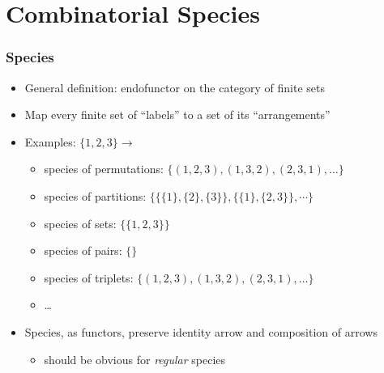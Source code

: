 \section{Combinatorial Species}

\begin{frame}
\frametitle{Species}

\begin{itemize}
\item General definition: endofunctor on the category of finite sets

\item Map every finite set of ``labels'' to a set of its ``arrangements''

\item Examples: $\{1, 2, 3\} \rightarrow$

\begin{itemize}
\item species of permutations:
$\big\{(1,2,3), (1,3,2), (2,3,1), \dots\big\}$
\item species of partitions:
$\Big\{\big\{\{1\},\{2\},\{3\}\big\}, \big\{\{1\}, \{2,3\}\big\}, \cdots \Big\}$
\item species of sets:
$\big\{\{1,2,3\}\big\}$
\item species of pairs:
$\{\}$
\item species of triplets:
$\big\{(1,2,3), (1,3,2), (2,3,1), \dots\big\}$
\item \dots
\end{itemize}

\item Species, as functors, preserve identity arrow and composition of arrows
\begin{itemize}
\item should be obvious for \textit{regular} species
\end{itemize}
\end{itemize}
\end{frame}


